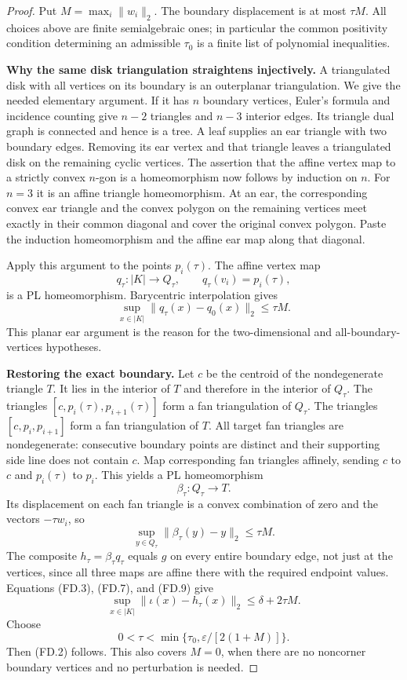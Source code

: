 \begin{proof}
Put $M=\max_i\|w_i\|_2$. The boundary displacement is at most
$\tau M$. All choices above are finite semialgebraic ones; in
particular the common positivity condition determining an admissible
$\tau_0$ is a finite list of polynomial inequalities.

\textbf{Why the same disk triangulation straightens injectively.}\quad
A triangulated disk with all vertices on its boundary is an
outerplanar triangulation. We give the needed elementary argument.
If it has $n$ boundary vertices, Euler's formula and incidence
counting give $n-2$ triangles and $n-3$ interior edges. Its triangle
dual graph is connected and hence is a tree. A leaf supplies an ear
triangle with two boundary edges. Removing its ear vertex and that
triangle leaves a triangulated disk on the remaining cyclic vertices.
The assertion that the affine vertex map to a strictly convex
$n$-gon is a homeomorphism now follows by induction on $n$.
For $n=3$ it is an affine triangle homeomorphism. At an ear, the
corresponding convex ear triangle and the convex polygon on the
remaining vertices meet exactly in their common diagonal and cover
the original convex polygon. Paste the induction homeomorphism and
the affine ear map along that diagonal.

Apply this argument to the points $p_i(\tau)$. The affine vertex map
\[
 q_\tau:|K|\longrightarrow Q_\tau,
 \qquad q_\tau(v_i)=p_i(\tau),
 \tag{FD.6}
\]
is a PL homeomorphism. Barycentric interpolation gives
\[
 \sup_{x\in|K|}\|q_\tau(x)-q_0(x)\|_2\le\tau M.
 \tag{FD.7}
\]
This planar ear argument is the reason for the two-dimensional and
all-boundary-vertices hypotheses.

\textbf{Restoring the exact boundary.}\quad
Let $c$ be the centroid of the nondegenerate triangle $T$.
It lies in the interior of $T$ and therefore in the interior of
$Q_\tau$. The triangles
$[c,p_i(\tau),p_{i+1}(\tau)]$ form a fan triangulation of $Q_\tau$.
The triangles $[c,p_i,p_{i+1}]$ form a fan triangulation of $T$.
All target fan triangles are nondegenerate: consecutive boundary
points are distinct and their supporting side line does not contain
$c$. Map corresponding fan triangles affinely, sending $c$ to $c$
and $p_i(\tau)$ to $p_i$. This yields a PL homeomorphism
\[
 \beta_\tau:Q_\tau\longrightarrow T.
 \tag{FD.8}
\]
Its displacement on each fan triangle is a convex combination of
zero and the vectors $-\tau w_i$, so
\[
 \sup_{y\in Q_\tau}\|\beta_\tau(y)-y\|_2\le\tau M.
 \tag{FD.9}
\]
The composite $h_\tau=\beta_\tau q_\tau$ equals $g$ on every entire
boundary edge, not just at the vertices, since all three maps are
affine there with the required endpoint values. Equations
(FD.3), (FD.7), and (FD.9) give
\[
 \sup_{x\in|K|}\|\iota(x)-h_\tau(x)\|_2
 \le\delta+2\tau M.
 \tag{FD.10}
\]
Choose
\[
 0<\tau<\min\{\tau_0,\varepsilon/[2(1+M)]\}.
 \tag{FD.11}
\]
Then (FD.2) follows. This also covers $M=0$, when there are no
noncorner boundary vertices and no perturbation is needed.


\end{proof}
